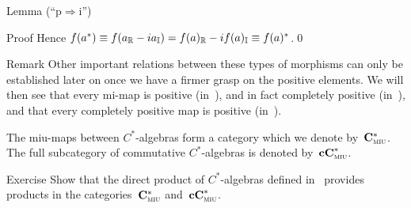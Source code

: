 \documentclass[a]{subfiles}
\begin{document}
\begin{parsec}
\begin{point}{Lemma (``p$\Rightarrow$i'')}
\begin{point}{Proof}
Hence $f(a^*)\equiv f(a_{\mathbb{R}}-ia_{\mathbb{I}})
=f(a)_{\mathbb{R}}-if(a)_{\mathbb{I}}\equiv f(a)^*$.\qed
\end{point}
\end{point}
\begin{point}{Remark}%
Other important relations between these types of morphisms
can only be established later on
once we have a firmer grasp on the positive elements.
We will then see
that every mi-map is positive (in~\sref{}),
and in fact completely positive (in~\sref{}),
and that every completely positive map is positive (in~\sref{}).
\end{point}
\begin{point}%
The miu-maps between $C^*$-algebras
form a category which we denote by~$\mathbf{C}^*_{\text{\textsc{miu}}}$.
The full subcategory of commutative $C^*$-algebras
is denoted by~$\mathbf{cC}^*_{\text{\textsc{miu}}}$.
\end{point}
\begin{point}{Exercise}%
Show that the direct product of $C^*$-algebras
defined in~
provides products in the categories~$\mathbf{C}^*_{\text{\textsc{miu}}}$
and~$\mathbf{cC}^*_{\text{\textsc{miu}}}$.
\end{point}

\end{parsec}
\end{document}
